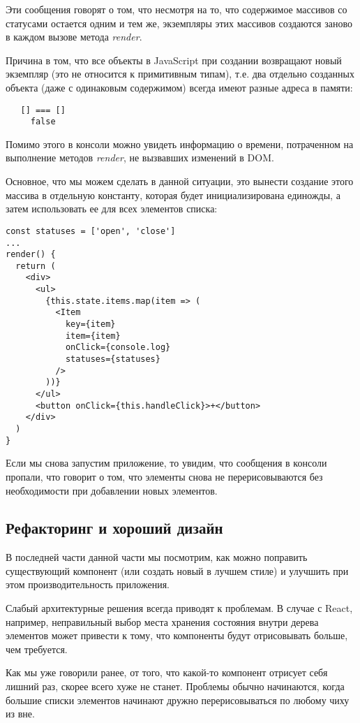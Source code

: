 Эти сообщения говорят о том, что несмотря на то, что содержимое массивов со статусами остается одним и тем же, экземпляры этих массивов создаются заново в каждом вызове метода \textit{render}.

Причина в том, что все объекты в JavaScript при создании возвращают новый экземпляр (это не относится к примитивным типам), т.е. два отдельно созданных объекта (даже с одинаковым содержимом) всегда имеют разные адреса в памяти:

\begin{lstlisting}
   [] === []
     false
\end{lstlisting}

Помимо этого в консоли можно увидеть информацию о времени, потраченном на выполнение методов \textit{render}, не вызвавших изменений в DOM.

Основное, что мы можем сделать в данной ситуации, это вынести создание этого массива в отдельную константу, которая будет инициализирована единожды, а затем использовать ее для всех элементов списка:

\begin{lstlisting}
const statuses = ['open', 'close']
...
render() {
  return (
    <div>
      <ul>
        {this.state.items.map(item => (
          <Item
            key={item}
            item={item}
            onClick={console.log}
            statuses={statuses}
          />
        ))}
      </ul>
      <button onClick={this.handleClick}>+</button>
    </div>
  )
}
\end{lstlisting}

Если мы снова запустим приложение, то увидим, что сообщения в консоли пропали, что говорит о том, что элементы снова не перерисовываются без необходимости при добавлении новых элементов.

\subsection{Рефакторинг и хороший дизайн}

В последней части данной части мы посмотрим, как можно поправить существующий компонент (или создать новый в лучшем стиле) и улучшить при этом производительность приложения.

Слабый архитектурные решения всегда приводят к проблемам. В случае с React, например, неправильный выбор места хранения состояния внутри дерева элементов может привести к тому, что компоненты будут отрисовывать больше, чем требуется.

Как мы уже говорили ранее, от того, что какой-то компонент отрисует себя лишний раз, скорее всего хуже не станет. Проблемы обычно начинаются, когда большие списки элементов начинают дружно перерисовываться по любому чиху из вне.

